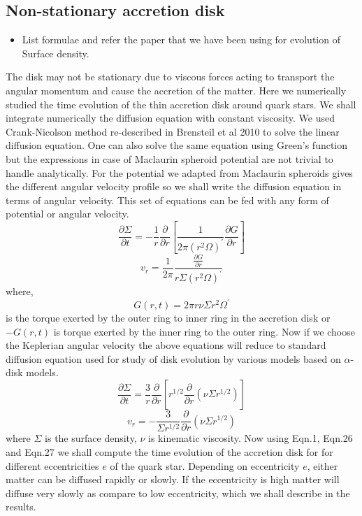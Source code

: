 \documentclass[useAMS,usenatbib]{mn2e}
\begin{document}
\subsection{Non-stationary accretion disk}
\begin{itemize}
\item List formulae and refer the paper that we have been using for
  evolution of Surface density. 
\end{itemize}
The disk may not be stationary due to viscous forces acting to transport the angular momentum and cause the accretion of the matter. Here we numerically studied the time evolution of the thin accretion disk around quark stars. We shall integrate numerically the diffusion equation with constant viscosity. We used Crank-Nicolson method re-described in Brensteil et al 2010 to solve the linear diffusion equation. One can also solve the same equation using Green's function but the expressions in case of Maclaurin spheroid potential are not trivial to handle analytically. For the potential we adapted from Maclaurin spheroids gives the different angular velocity profile so we shall write the diffusion equation in terms of angular velocity. This set of equations can be fed with any form of potential or angular velocity.
\begin{equation}
\frac{\partial\Sigma}{\partial t} = -\frac{1}{r}\frac{\partial}{\partial r}\left[\frac{1}{2\pi(r^2\Omega)^\prime}\frac{\partial G}{\partial r}\right]
\end{equation}
\begin{equation}
v_r = \frac{1}{2\pi}\frac{\frac{\partial G}{\partial r}}{r\Sigma (r^2\Omega)^\prime}
\end{equation}
where,
\begin{equation}
G(r,t) = 2\pi r\nu\Sigma r^2 \Omega^\prime 
\end{equation}
is the torque exerted by the outer ring to inner ring in the accretion disk or $-G(r,t)$ is torque exerted by the inner ring to the outer ring. Now if we choose the Keplerian angular velocity the above equations will reduce to standard diffusion equation used for study of disk evolution by various models based on $\alpha$-disk models.
\begin{equation}
\frac{\partial\Sigma}{\partial t} = \frac{3}{r}\frac{\partial}{\partial r}\left[r^{1/2}\frac{\partial}{\partial r}\left(\nu\Sigma r^{1/2}\right)\right]
\end{equation}
\begin{equation}
v_r = -\frac{3}{\Sigma r^{1/2}}\frac{\partial}{\partial r}\left(\nu\Sigma r^{1/2}\right)
\end{equation}
where $\Sigma$ is the surface density, $\nu$ is kinematic viscosity. Now using Eqn.1, Eqn.26 and Eqn.27 we shall compute the time evolution of the accretion disk for for different eccentricities $e$ of the quark star. Depending on eccentricity $e$, either matter can be diffused rapidly or slowly. If the eccentricity is high matter will diffuse very slowly as compare to low eccentricity, which we shall describe in the results.
\end{document}
